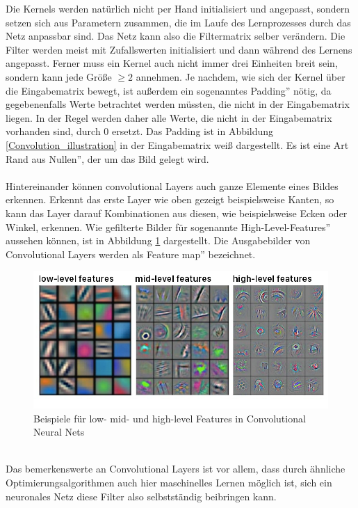\documentclass[11pt]{article}
\begin{document}
Die Kernels werden natürlich nicht per Hand initialisiert und angepasst, sondern setzen sich aus Parametern zusammen, die im Laufe des Lernprozesses durch das Netz anpassbar sind. Das Netz kann also die Filtermatrix selber verändern. Die Filter werden meist mit Zufallswerten initialisiert und dann während des Lernens  angepasst. Ferner muss ein Kernel auch nicht immer drei Einheiten breit sein, sondern kann jede Größe $\ge2$ annehmen. Je nachdem, wie sich der Kernel über die Eingabematrix bewegt, ist außerdem ein sogenanntes \glqq Padding'' nötig, da gegebenenfalls Werte betrachtet werden müssten, die nicht in der Eingabematrix liegen. In der Regel werden daher alle Werte, die nicht in der Eingabematrix vorhanden sind, durch 0 ersetzt. Das Padding ist in Abbildung \ref{Convolution_illustration} in der Eingabematrix weiß dargestellt. Es ist eine Art \glqq Rand aus Nullen'', der um das Bild gelegt wird.
\\ 
\\
Hintereinander können convolutional Layers auch ganze Elemente eines Bildes erkennen. Erkennt das erste Layer wie oben gezeigt beispielsweise Kanten, so kann das Layer darauf Kombinationen aus diesen, wie beispielsweise Ecken oder Winkel, erkennen. Wie gefilterte Bilder für sogenannte \glqq High-Level-Features'' aussehen können, ist in Abbildung \ref{HL_features_conv} dargestellt. Die Ausgabebilder von Convolutional Layers werden als \glqq Feature map'' bezeichnet.
\begin{figure}[h]
	\includegraphics[width=\linewidth]{../graphics/features.png}
	\caption[Beispiele für low-, mid- und high-level Features in Convolutional Neural Nets\newline
	Quelle: https://tvirdi.github.io/2017-10-29/cnn/]{Beispiele für low- mid- und high-level Features in Convolutional Neural Nets}
	\label{HL_features_conv}
\end{figure}
\\
Das bemerkenswerte an Convolutional Layers ist vor allem, dass durch ähnliche Optimierungsalgorithmen auch hier maschinelles Lernen möglich ist, sich ein neuronales Netz diese Filter also selbstständig beibringen kann.
\end{document}
